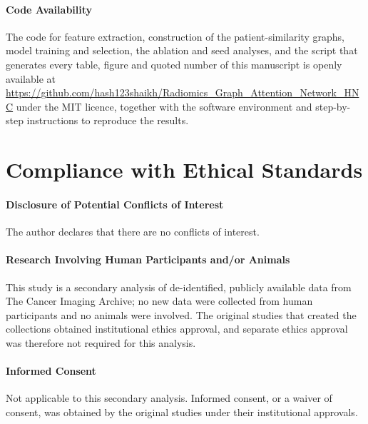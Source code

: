 \documentclass[11pt,a4paper]{article}
\begin{document}
\paragraph{Code Availability}
The code for feature extraction, construction of the patient-similarity graphs, model training and selection, the ablation and seed analyses, and the script that generates every table, figure and quoted number of this manuscript is openly available at \url{https://github.com/hash123shaikh/Radiomics_Graph_Attention_Network_HNC} under the MIT licence, together with the software environment and step-by-step instructions to reproduce the results.

\section*{Compliance with Ethical Standards}

\paragraph{Disclosure of Potential Conflicts of Interest}
The author declares that there are no conflicts of interest.

\paragraph{Research Involving Human Participants and/or Animals}
This study is a secondary analysis of de-identified, publicly available data from The Cancer Imaging Archive; no new data were collected from human participants and no animals were involved. The original studies that created the collections obtained institutional ethics approval, and separate ethics approval was therefore not required for this analysis.

\paragraph{Informed Consent}
Not applicable to this secondary analysis. Informed consent, or a waiver of consent, was obtained by the original studies under their institutional approvals.
\end{document}
